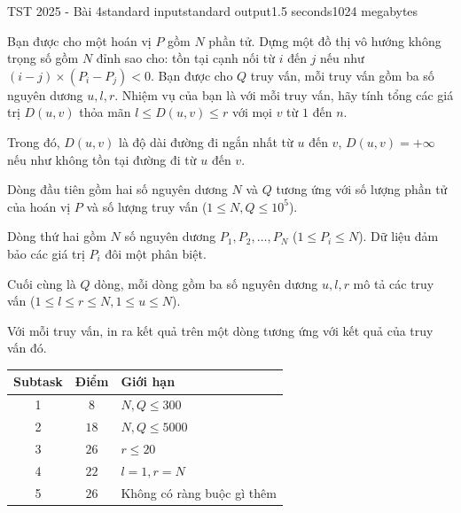 \begin{problem}{TST 2025 - Bài 4}{standard input}{standard output}{1.5 seconds}{1024 megabytes}

Bạn được cho một hoán vị $P$ gồm $N$ phần tử. Dựng một đồ thị vô hướng không trọng số gồm $N$ đỉnh sao cho: tồn tại cạnh nối từ $i$ đến $j$ nếu như $(i-j)\times (P_i-P_j)<0$. Bạn được cho $Q$ truy vấn, mỗi truy vấn gồm ba số nguyên dương $u,l,r$. Nhiệm vụ của bạn là với mỗi truy vấn, hãy tính tổng các giá trị $D(u,v)$ thỏa mãn $l\le D(u,v)\le r$ với mọi $v$ từ $1$ đến $n$.

Trong đó, $D(u,v)$ là độ dài đường đi ngắn nhất từ $u$ đến $v$, $D(u,v)=+\infty$ nếu như không tồn tại đường đi từ $u$ đến $v$.

\InputFile
Dòng đầu tiên gồm hai số nguyên dương $N$ và $Q$ tương ứng với số lượng phần tử của hoán vị $P$ và số lượng truy vấn ($1\le N,Q\le 10^5$).

Dòng thứ hai gồm $N$ số nguyên dương $P_1,P_2,\dots,P_N$ ($1\le P_i\le N$). Dữ liệu đảm bảo các giá trị $P_i$ đôi một phân biệt.

Cuối cùng là $Q$ dòng, mỗi dòng gồm ba số nguyên dương $u,l,r$ mô tả các truy vấn ($1\le l\le r\le N,1\le u\le N$).

\OutputFile
Với mỗi truy vấn, in ra kết quả trên một dòng tương ứng với kết quả của truy vấn đó.

\Scoring
\begin{center}
  \begin{tabular}{|c|c|l|} \hline
    \textbf{Subtask} & \textbf{Điểm} & \textbf{Giới hạn} \\ \hline
    1 & $8$ & $N,Q \leq 300$ \\ \hline
    2 & $18$ & $N,Q\le 5000$ \\ \hline
    3 & $26$ & $r \leq 20$ \\ \hline
    4 & $22$ & $l=1, r=N$ \\ \hline
    5 & $26$ & Không có ràng buộc gì thêm \\ \hline
  \end{tabular}
\end{center}


\Example

\begin{example}
%
\end{example}

\end{problem}

